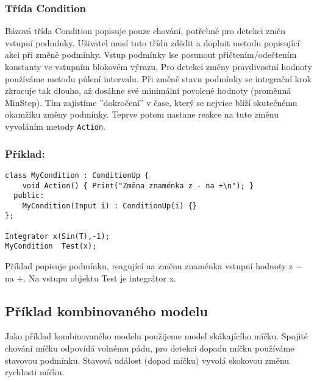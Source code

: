 \documentclass[a4paper]{article}
\begin{document}
\subsubsection{Třída Condition}

Bázová třída Condition popisuje pouze chování, potřebné pro
detekci změn vstupní podmínky. Uživatel musí tuto třídu zdědit
a doplnit metodu popisující
akci při změně podmínky. Vstup podmínky lse posunout přičtením/odečtením
konstanty ve vstupním blokovém výrazu.
Pro detekci změny pravdivostní
hodnoty používáme metodu půlení intervalu. Při změně stavu
podmínky se integrační krok zkracuje tak dlouho, až dosáhne své
minimální povolené hodnoty (proměnná MinStep). Tím zajistíme
''dokročení'' v čase, který se nejvíce blíží skutečnému okamžiku
změny podmínky. Teprve potom nastane reakce na tuto změnu
vyvoláním metody \texttt{Action}. 

\subsubsection*{Příklad:}

\begin{verbatim}
class MyCondition : ConditionUp {
    void Action() { Print("Změna znaménka z - na +\n"); }
  public:
    MyCondition(Input i) : ConditionUp(i) {}
};

Integrator x(Sin(T),-1);
MyCondition  Test(x);
\end{verbatim}

Příklad popisuje podmínku, reagující na změnu znaménka vstupní
hodnoty z $-$ na $+$. Na vstupu objektu Test je integrátor x.


\subsection{Příklad kombinovaného modelu}

Jako příklad kombinovaného modelu použijeme model skákajícího
míčku. Spojité chování míčku odpovídá volnému pádu, pro detekci
dopadu míčku používáme stavovou podmínku. Stavová událost (dopad
míčku) vyvolá skokovou změnu rychlosti míčku.
\end{document}
